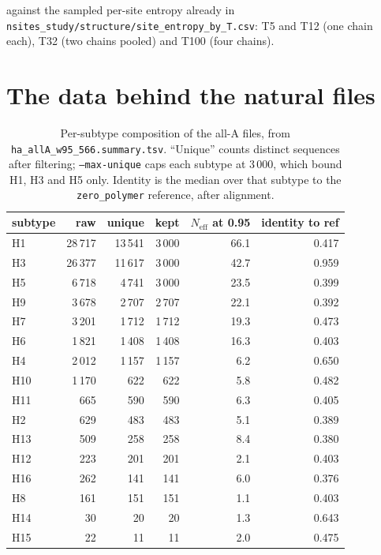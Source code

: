 \documentclass[11pt,a4paper]{article}
\newcommand{\file}[1]{\texttt{#1}}
\newcommand{\Neff}{N_{\mathrm{eff}}}
\begin{document}
\noindent
against the sampled per-site entropy already in
\file{nsites\_study/structure/site\_entropy\_by\_T.csv}: T5 and T12 (one chain
each), T32 (two chains pooled) and T100 (four chains).

\section{The data behind the natural files}
\label{sec:data}

\begin{table}[h]
\centering
\caption{Per-subtype composition of the all-A files, from
\file{ha\_allA\_w95\_566.summary.tsv}. ``Unique'' counts distinct sequences after
filtering; \file{--max-unique} caps each subtype at 3\,000, which bound H1, H3
and H5 only. Identity is the median over that subtype to the \file{zero\_polymer}
reference, after alignment.}
\label{tab:data}
\small
\begin{tabular}{@{}lrrrrr@{}}
\toprule
subtype & raw & unique & kept & $\Neff$ at 0.95 & identity to ref \\
\midrule
H1  & 28\,717 & 13\,541 & 3\,000 & 66.1 & 0.417 \\
H3  & 26\,377 & 11\,617 & 3\,000 & 42.7 & 0.959 \\
H5  &  6\,718 &  4\,741 & 3\,000 & 23.5 & 0.399 \\
H9  &  3\,678 &  2\,707 & 2\,707 & 22.1 & 0.392 \\
H7  &  3\,201 &  1\,712 & 1\,712 & 19.3 & 0.473 \\
H6  &  1\,821 &  1\,408 & 1\,408 & 16.3 & 0.403 \\
H4  &  2\,012 &  1\,157 & 1\,157 &  6.2 & 0.650 \\
H10 &  1\,170 &    622  &   622  &  5.8 & 0.482 \\
H11 &     665 &    590  &   590  &  6.3 & 0.405 \\
H2  &     629 &    483  &   483  &  5.1 & 0.389 \\
H13 &     509 &    258  &   258  &  8.4 & 0.380 \\
H12 &     223 &    201  &   201  &  2.1 & 0.403 \\
H16 &     262 &    141  &   141  &  6.0 & 0.376 \\
H8  &     161 &    151  &   151  &  1.1 & 0.403 \\
H14 &      30 &     20  &    20  &  1.3 & 0.643 \\
H15 &      22 &     11  &    11  &  2.0 & 0.475 \\
\bottomrule
\end{tabular}
\end{table}
\end{document}
